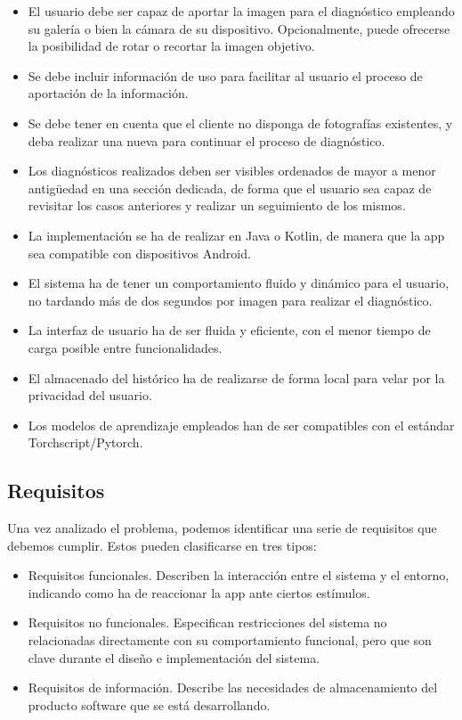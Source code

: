 \begin{itemize}

	\item El usuario debe ser capaz de aportar la imagen para el diagnóstico empleando su galería o bien la cámara de su dispositivo. Opcionalmente, puede ofrecerse la posibilidad de rotar o recortar la imagen objetivo.
	\item Se debe incluir información de uso para facilitar al usuario el proceso de aportación de la información.
	\item Se debe tener en cuenta que el cliente no disponga de fotografías existentes, y deba realizar una nueva para continuar el proceso de diagnóstico.
	\item Los diagnósticos realizados deben ser visibles ordenados de mayor a menor antigüedad en una sección dedicada, de forma que el usuario sea capaz de revisitar los casos anteriores y realizar un seguimiento de los mismos.
	\item La implementación se ha de realizar en Java o Kotlin, de manera que la app sea compatible con dispositivos Android.
	\item El sistema ha de tener un comportamiento fluido y dinámico para el usuario, no tardando más de dos segundos por imagen para realizar el diagnóstico.
	\item La interfaz de usuario ha de ser fluida y eficiente, con el menor tiempo de carga posible entre funcionalidades.
	\item El almacenado del histórico ha de realizarse de forma local para velar por la privacidad del usuario.
	\item Los modelos de aprendizaje empleados han de ser compatibles con el estándar Torchscript/Pytorch.
\end{itemize}

\subsection{Requisitos}

Una vez analizado el problema, podemos identificar una serie de requisitos que debemos cumplir. Estos pueden clasificarse en tres tipos:

\begin{itemize}
	\item Requisitos funcionales. Describen la interacción entre el sistema y el entorno, indicando como ha de reaccionar la app ante ciertos estímulos.
	\item Requisitos no funcionales. Especifican restricciones del sistema no relacionadas directamente con su comportamiento funcional, pero que son clave durante el diseño e implementación del sistema.
	\item Requisitos de información. Describe las necesidades de almacenamiento del producto software que se está desarrollando.
\end{itemize}

